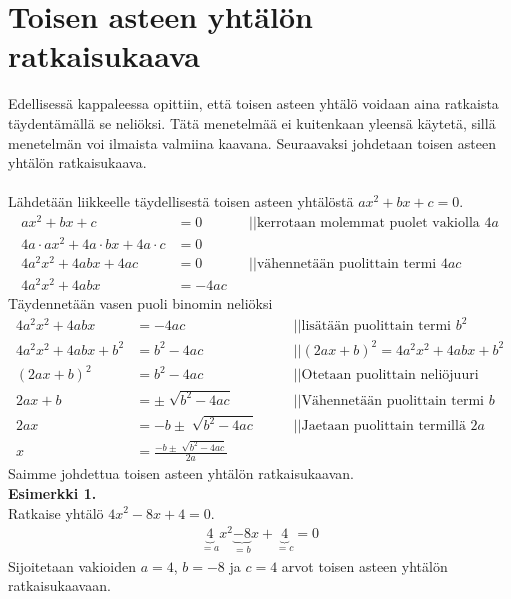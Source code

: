 \chapter{Toisen asteen yhtälön ratkaisukaava}
Edellisessä kappaleessa opittiin, että toisen asteen yhtälö voidaan aina ratkaista täydentämällä se neliöksi. Tätä menetelmää ei kuitenkaan yleensä käytetä, sillä menetelmän voi ilmaista valmiina kaavana. Seuraavaksi johdetaan toisen asteen yhtälön ratkaisukaava. \\ \\

Lähdetään liikkeelle täydellisestä toisen asteen yhtälöstä $ax^2+bx+c=0$.
\begin{align*}
ax^2+bx+c&=0 \ \ \ \ \ &&|| \text{kerrotaan molemmat puolet vakiolla }4a \\
4a \cdot ax^2+4a \cdot bx + 4a \cdot c&=0 \\
4a^2x^2+4abx+4ac&=0 \ \ \ \ \ &&|| \text{vähennetään puolittain termi }4ac  \\
4a^2x^2+4abx&=-4ac
\end{align*}
Täydennetään vasen puoli binomin neliöksi
\begin{align*}
4a^2x^2+4abx&=-4ac \ \ \ \ \ &&|| \text{lisätään puolittain termi } b^2 \\
4a^2x^2+4abx+b^2&=b^2-4ac \ \ \ \ \ &&||(2ax+b)^2=4a^2x^2+4abx+b^2 \\
(2ax+b)^2&=b^2-4ac  \ \ \ \ \ &&||\text{Otetaan puolittain neliöjuuri } \\
2ax+b&= \pm \sqrt[]{b^2-4ac} \ \ \ \ \ &&||\text{Vähennetään puolittain termi } b \\
2ax&=-b \pm \sqrt[]{b^2-4ac} \ \ \ \ \ &&||\text{Jaetaan puolittain termillä } 2a \\
x&= \frac{-b \pm \sqrt[]{b^2-4ac}}{2a} 
\end{align*}
Saimme johdettua toisen asteen yhtälön ratkaisukaavan. \\ 
\textbf{Esimerkki 1.}  \\
Ratkaise yhtälö $4x^2-8x+4=0$.
\begin{align*}
\underbrace{4}_{=a}x^2 \underbrace{-8}_{=b}x+\underbrace{4}_{=c}=0
\end{align*}
Sijoitetaan vakioiden $a=4$, $b=-8$ ja $c=4$ arvot toisen asteen yhtälön ratkaisukaavaan.
